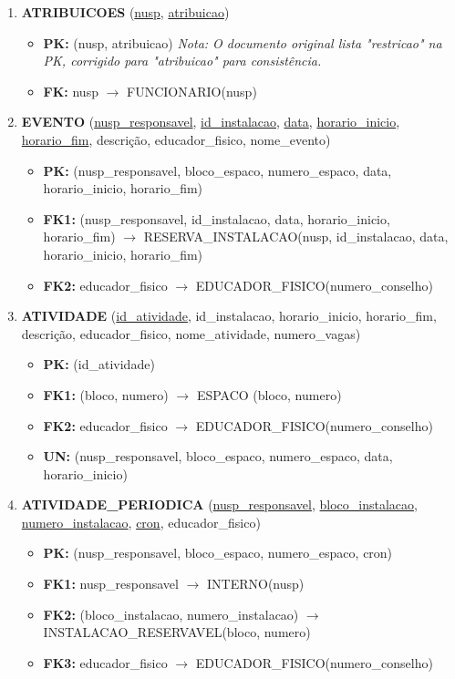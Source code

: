 \documentclass{article}
\begin{document}
\begin{enumerate}
    \item \textbf{ATRIBUICOES} (\underline{nusp}, \underline{atribuicao})
        \begin{itemize}
            \item \textbf{PK:} (nusp, atribuicao) \textit{Nota: O documento original lista "restricao" na PK, corrigido para "atribuicao" para consistência.}
            \item \textbf{FK:} nusp $\rightarrow$ FUNCIONARIO(nusp)
        \end{itemize}

    \item \textbf{EVENTO} (\underline{nusp\_responsavel}, \underline{id\_instalacao}, \underline{data}, \underline{horario\_inicio}, \underline{horario\_fim}, descrição, educador\_fisico, nome\_evento)
        \begin{itemize}
            \item \textbf{PK:} (nusp\_responsavel, bloco\_espaco, numero\_espaco, data, horario\_inicio, horario\_fim)
            \item \textbf{FK1:} (nusp\_responsavel, id\_instalacao, data, horario\_inicio, horario\_fim) $\rightarrow$ RESERVA\_INSTALACAO(nusp, id\_instalacao, data, horario\_inicio, horario\_fim)
            \item \textbf{FK2:} educador\_fisico $\rightarrow$ EDUCADOR\_FISICO(numero\_conselho)
        \end{itemize}

    \item \textbf{ATIVIDADE} (\underline{id\_atividade}, id\_instalacao, horario\_inicio, horario\_fim, descrição, educador\_fisico, nome\_atividade, numero\_vagas)
        \begin{itemize}
            \item \textbf{PK:} (id\_atividade)
            \item \textbf{FK1:} (bloco, numero) $\rightarrow$ ESPACO (bloco, numero)
            \item \textbf{FK2:} educador\_fisico $\rightarrow$ EDUCADOR\_FISICO(numero\_conselho)
            \item \textbf{UN:} (nusp\_responsavel, bloco\_espaco, numero\_espaco, data, horario\_inicio)
        \end{itemize}

    \item \textbf{ATIVIDADE\_PERIODICA} (\underline{nusp\_responsavel}, \underline{bloco\_instalacao}, \underline{numero\_instalacao}, \underline{cron}, educador\_fisico)
        \begin{itemize}
            \item \textbf{PK:} (nusp\_responsavel, bloco\_espaco, numero\_espaco, cron)
            \item \textbf{FK1:} nusp\_responsavel $\rightarrow$ INTERNO(nusp)
            \item \textbf{FK2:} (bloco\_instalacao, numero\_instalacao) $\rightarrow$ INSTALACAO\_RESERVAVEL(bloco, numero)
            \item \textbf{FK3:} educador\_fisico $\rightarrow$ EDUCADOR\_FISICO(numero\_conselho)
        \end{itemize}


\end{enumerate}
\end{document}
